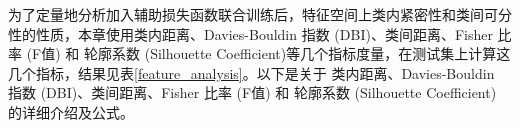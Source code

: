 






为了定量地分析加入辅助损失函数联合训练后，特征空间上类内紧密性和类间可分性的性质，本章使用类内距离、Davies-Bouldin 指数 (DBI)、类间距离、Fisher 比率 (F值) 和 轮廓系数 (Silhouette Coefficient)等几个指标度量，在测试集上计算这几个指标，结果见表\ref{feature_analysis}。以下是关于 类内距离、Davies-Bouldin 指数 (DBI)、类间距离、Fisher 比率 (F值) 和 轮廓系数 (Silhouette Coefficient) 的详细介绍及公式。

